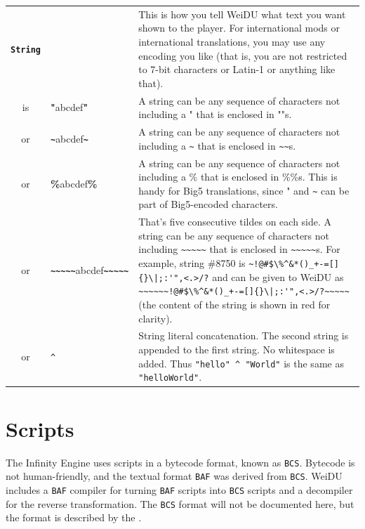 \documentclass{article}
\def\ttref#1{\ahrefloc{#1}{\tt #1}}
\def\DEFINE#1{{\tt \bf #1}\label{#1}\index{#1}}
\def\t#1{{\tt #1}}
\begin{document}
\begin{tabular}{cp{10in}|p{10in}}
\DEFINE{String}\label{string} & & This is how you tell WeiDU what text you want shown
to the player. For international mods or international translations, you
may use any encoding you like (that is, you are not restricted to 7-bit
characters or Latin-1 or anything like that). \\
is & {\bf{"}}abcdef{\bf{"}} & A string can be any sequence of characters not
including a " that is enclosed in ""s. \\
or & {\bf{\verb+~+}}abcdef{\bf\verb+~+} & A string can be any sequence of
characters not including a \verb+~+ that is enclosed in
{\verb+~+\verb+~+}s. \\
or & {\bf{\%}}abcdef{\bf{\%}} & A string can be any sequence of characters not
including a \% that is enclosed in \%\%s. This is handy for Big5
translations, since " and \verb+~+ can be part of Big5-encoded characters.
\\
or & {\bf{\verb+~~~~~+}}abcdef{\bf\verb+~~~~~+} & That's five consecutive
tildes on each side. A string can be any
sequence of characters not including \verb+~~~~~+ that is enclosed in
{\verb+~~~~~+}s. For example,
string \#8750 is
{\color{red}\verb`~!@#$\%^&*()_+-=[]{}\|;:'",<.>/?`}
and can be given to WeiDU as
{\verb+~~~~~+}{\color{red}\verb`~!@#$\%^&*()_+-=[]{}\|;:'",<.>/?`}{\verb+~~~~~+}
 (the content of the string is shown in red for clarity).
\\
or & \ttref{String} \t{\^{ }} \ttref{String} & String literal concatenation.
The second string is appended to the first string. No whitespace is added.
Thus \t{"hello" \^{ } "World"} is the same as \t{"helloWorld"}.

\\

\end{tabular}

\section{Scripts}

The Infinity Engine uses scripts in a bytecode format, known as
\t{BCS}. Bytecode is not human-friendly, and the textual format
\t{BAF} was derived from \t{BCS}. WeiDU includes a \t{BAF} compiler
for turning \t{BAF} scripts into \t{BCS} scripts and a decompiler for
the reverse transformation. The \t{BCS} format will not be documented
here, but the format is described by the
.
\end{document}

